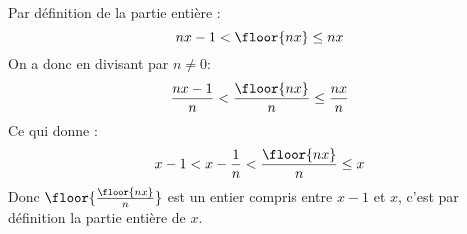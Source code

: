
\begin{correction}
Par définition de la partie entière : 
$$nx-1<\floor{nx}\leq nx$$
On a donc en divisant par $n\neq 0$:
$$\frac{nx-1}{n}<\frac{\floor{nx}}{n} \leq \frac{nx}{n}$$
Ce qui donne : 
$$x-1<x-\frac{1}{n}<\frac{\floor{nx}}{n} \leq x$$
Donc 
$\floor{\frac{\floor{nx}}{n}}$ est un entier compris entre $x-1 $ et $x$, c'est par définition la partie entière de $x$. 


\end{correction}